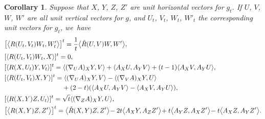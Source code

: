 \documentclass[11pt]{article}
\numberwithin{equation}{section}
\numberwithin{equation}{section}
\newtheorem{Corollary}[Theorem]{Corollary}
\begin{document}
\begin{Corollary}\label{formulas4}
	Suppose that $X$, $Y$, $Z$, $Z'$ are unit horizontal vectors for $g_t$. If $U$, $V$, $W$, $W'$ are all unit vertical vectors for $g$, and $U_t$, $V_t$, $W_t$, $W'_t$ the corresponding unit vectors for $g_t$, we~have
	\begin{align*}
		&\bigl[\bigl\langle R(U_t,V_t)W_t,W'_t \bigr\rangle\bigr]^t =\frac{1}{t}\bigl\langle \hat{R}(U,V)W,W' \bigr\rangle, \\
		&[\langle R(U_t,V_t)W_t,X\rangle]^t =0, \\
		&[\langle R(X,U_t)Y,V_t \rangle]^t =\langle (\nabla_U A)_X Y,V \rangle +\langle A_X U, A_Y V\rangle+(t-1)\langle A_XV,A_YU\rangle,\\
		&[\langle R(U_t,V_t)X,Y \rangle]^t =\langle (\nabla_U A)_X Y,V \rangle-\langle (\nabla_V A)_X Y,U\rangle\\
		&\hphantom{[\langle R(U_t,V_t)X,Y \rangle]^t =}{} +(2-t)(\langle A_XU,A_YV\rangle-\langle A_XV,A_YU\rangle),\\
		&[\langle R(X,Y)Z,U_t \rangle]^t = \sqrt{t}\langle (\nabla_ZA)_X Y,U \rangle, \\
		&\bigl[\bigl\langle R(X,Y)Z,Z' \bigr\rangle\bigr]^t =\bigl\langle \check{R}(X,Y)Z,Z' \bigr\rangle\!-2t\bigl\langle A_XY,A_ZZ' \bigr\rangle\! + t\bigl\langle A_Y Z,A_X Z'\bigr\rangle\!-t\bigl\langle A_X Z, A_Y Z'\bigr\rangle.
	\end{align*}
\end{Corollary}
\end{document}
